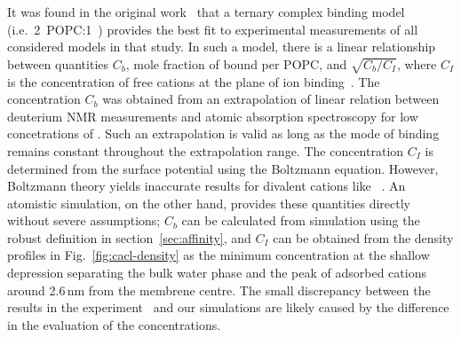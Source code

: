 \documentclass[aip,jcp,twocolumn]{revtex4}
\begin{document}
It was found in the original work~\cite{altenbach84} that 
a ternary complex binding model (i.e.~2~POPC:1~)
provides the best fit to experimental measurements of all considered models in that study. 
In such a model, there is a linear relationship between quantities 
$C_b$, mole fraction of bound  per POPC, and $\sqrt{C_b/C_I}$, 
where $C_I$ is the concentration of free cations at the plane of ion binding~\cite{altenbach84}.
The concentration $C_b$ was obtained from an extrapolation of linear relation 
between deuterium NMR measurements and atomic absorption spectroscopy for low concetrations of .
Such an extrapolation is valid as long as the mode of  binding 
remains constant throughout the extrapolation range. 
The concentration $C_I$ is determined from the surface potential using the Boltzmann equation.
However, Boltzmann theory yields inaccurate results
for divalent cations like ~\cite{Andelman1995}. 
An atomistic simulation, on the other hand, provides these quantities directly without severe assumptions;
$C_b$ can be calculated from simulation using the robust definition in section~\ref{sec:affinity},
and $C_I$ can be obtained from the density profiles in Fig.~\ref{fig:cacl-density} 
as the minimum concentration at the shallow depression separating the bulk water phase 
and the peak of adsorbed cations around 2.6\,nm from the membrene centre. 
The small discrepancy between the results in the experiment~\cite{altenbach84} and 
our simulations are likely caused by the difference in the evaluation of the concentrations. 
\end{document}
